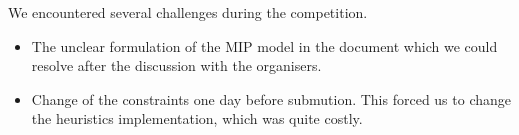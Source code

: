 \documentclass[a4paper]{article}
\begin{document}
We encountered several challenges during the competition. 

\begin{itemize}
    \item The unclear formulation of the MIP model in the document which we could resolve after the discussion with the organisers.
    \item Change of the constraints one day before submution. This forced us to change the heuristics implementation, which was quite costly.
\end{itemize}
\end{document}
